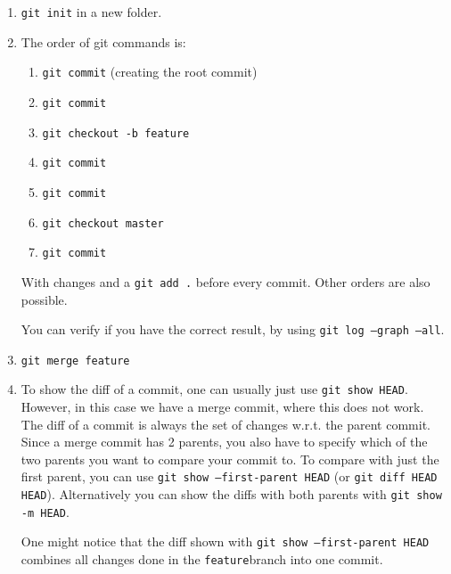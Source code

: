 \documentclass[english]{sheet}
\begin{document}
\begin{solution}
    \begin{enumerate}
        \item \texttt{git init} in a new folder.
        \item The order of git commands is:
            \begin{enumerate}[1.]
                \item \texttt{git commit} (creating the root commit)
                \item \texttt{git commit}
                \item \texttt{git checkout -b feature}
                \item \texttt{git commit}
                \item \texttt{git commit}
                \item \texttt{git checkout master}
                \item \texttt{git commit}
            \end{enumerate}
            With changes and a \texttt{git add .} before every commit. Other orders are also possible.

            You can verify if you have the correct result, by using \texttt{git log --graph --all}.
        \item \texttt{git merge feature}
        \item To show the diff of a commit, one can usually just use \texttt{git show HEAD}. However, in this case we have a merge commit, where this does not work. The diff of a commit is always the set of changes w.r.t. the parent commit. Since a merge commit has 2 parents, you also have to specify which of the two parents you want to compare your commit to. To compare with just the first parent, you can use \texttt{git show --first-parent HEAD} (or \texttt{git diff HEAD~ HEAD}). Alternatively you can show the diffs with both parents with \texttt{git show -m HEAD}.

            One might notice that the diff shown with \texttt{git show --first-parent HEAD} combines all changes done in the \verb|feature|branch into one commit.
    \end{enumerate}
\end{solution}
\end{document}
